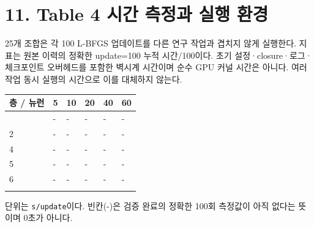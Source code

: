 \documentclass[10pt,a4paper]{article}
\begin{document}
\clearpage

\section{11. Table 4 시간 측정과 실행 환경}

25개 조합은 각 100 L-BFGS 업데이트를 다른 연구 작업과 겹치지 않게 실행한다. 지표는 원본 이력의 정확한 update=100 누적 시간/100이다. 초기 설정·closure·로그·체크포인트 오버헤드를 포함한 벽시계 시간이며 순수 GPU 커널 시간은 아니다. 여러 작업 동시 실행의 시간으로 이를 대체하지 않는다.\par

\begingroup\small

\par\begin{minipage}{\linewidth}\begin{tabular}{>{\raggedright\arraybackslash}p{}>{\raggedright\arraybackslash}p{}>{\raggedright\arraybackslash}p{}>{\raggedright\arraybackslash}p{}>{\raggedright\arraybackslash}p{}>{\raggedright\arraybackslash}p{}}

\rowcolor{tint} \textbf{층 / 뉴런} & \textbf{5} & \textbf{10} & \textbf{20} & \textbf{40} & \textbf{60}\\\midrule

1 & - & - & - & - & -\\\addlinespace[2pt]

2 & - & - & - & - & -\\\addlinespace[2pt]

4 & - & - & - & - & -\\\addlinespace[2pt]

5 & - & - & - & - & -\\\addlinespace[2pt]

6 & - & - & - & - & -\\\addlinespace[2pt]

\bottomrule\end{tabular}\end{minipage}\par\vspace{5pt}\endgroup

{\small\color{muted} 단위는 \nolinkurl{s/update}이다. 빈칸(-)은 검증 완료의 정확한 100회 측정값이 아직 없다는 뜻이며 0초가 아니다.\par}
\end{document}
